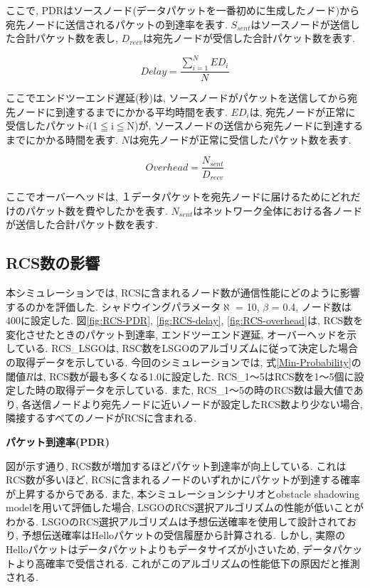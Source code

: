 \documentclass[10pt]{jreport}
\begin{document}
ここで, PDRはソースノード(データパケットを一番初めに生成したノード)から宛先ノードに送信されるパケットの到達率を表す. $S_{sent}$はソースノードが送信した合計パケット数を表し, $D_{recv}$は宛先ノードが受信した合計パケット数を表す.

\begin{equation}
	\label{delay}
	Delay = \frac{\sum_{i=1}^{N}ED_i}{N}
\end{equation}

ここでエンドツーエンド遅延(秒)は, ソースノードがパケットを送信してから宛先ノードに到達するまでにかかる平均時間を表す. $ED_i$は, 宛先ノードが正常に受信したパケット$i$(1$ \leqq $i$ \leqq $N)が, ソースノードの送信から宛先ノードに到達するまでにかかる時間を表す. 
$N$は宛先ノードが正常に受信したパケット数を表す.

\begin{equation}
	\label{overhead}
	Overhead = \frac{N_{sent}}{  D_{recv}  }
\end{equation}

ここでオーバーヘッドは, １データパケットを宛先ノードに届けるためにどれだけのパケット数を費やしたかを表す. $N_{sent}$はネットワーク全体における各ノードが送信した合計パケット数を表す.

\subsection{RCS数の影響}
本シミュレーションでは, RCSに含まれるノード数が通信性能にどのように影響するのかを評価した.
シャドウイングパラメータ$\aleph$ = 10, $\beta$ = 0.4, ノード数は400に設定した.
図\ref{fig:RCS-PDR}, \ref{fig:RCS-delay}, \ref{fig:RCS-overhead}は, RCS数を変化させたときのパケット到達率, エンドツーエンド遅延, オーバーヘッドを示している. RCS\_LSGOは, RSC数をLSGOのアルゴリズムに従って決定した場合の取得データを示している. 今回のシミュレーションでは, 式\ref{Min-Probability}の閾値$R$は, RCS数が最も多くなる1.0に設定した. RCS\_1～5はRCS数を1～5個に設定した時の取得データを示している. また, RCS\_1～5の時のRCS数は最大値であり, 各送信ノードより宛先ノードに近いノードが設定したRCS数より少ない場合, 隣接するすべてのノードがRCSに含まれる.
\par
\vspace{5mm}
\noindent
\textbf{パケット到達率(PDR)}
\vspace{5mm}


図が示す通り, RCS数が増加するほどパケット到達率が向上している. これはRCS数が多いほど, RCSに含まれるノードのいずれかにパケットが到達する確率が上昇するからである. また, 本シミュレーションシナリオとobstacle shadowing modelを用いて評価した場合, LSGOのRCS選択アルゴリズムの性能が低いことがわかる. LSGOのRCS選択アルゴリズムは予想伝送確率を使用して設計されており, 予想伝送確率はHelloパケットの受信履歴から計算される. しかし, 実際のHelloパケットはデータパケットよりもデータサイズが小さいため, データパケットより高確率で受信される. これがこのアルゴリズムの性能低下の原因だと推測される.
\end{document}
